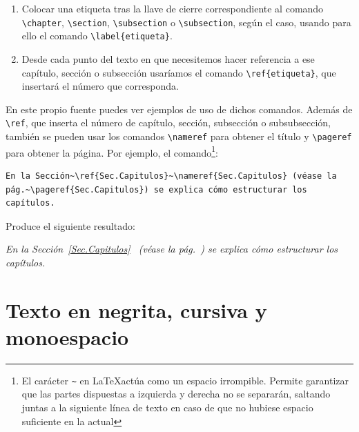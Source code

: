 \begin{enumerate}
    \item Colocar una etiqueta tras la llave de cierre correspondiente al comando \verb|\chapter|, \verb|\section|, \verb|\subsection| o \verb|\subsection|, según el caso, usando para ello el comando \verb|\label{etiqueta}|.
    \item Desde cada punto del texto en que necesitemos hacer referencia a ese capítulo, sección o subsección usaríamos el comando \verb|\ref{etiqueta}|, que insertará el número que corresponda.
\end{enumerate}

En este propio fuente puedes ver ejemplos de uso de dichos comandos. Además de \verb|\ref|, que inserta el número de capítulo, sección, subsección o subsubsección, también se pueden usar los comandos \verb|\nameref| para obtener el título y \verb|\pageref| para obtener la página. Por ejemplo, el comando\footnote{El carácter \texttt{\~} en \LaTeX actúa como un espacio irrompible. Permite garantizar que las partes dispuestas a izquierda y derecha no se separarán, saltando juntas a la siguiente línea de texto en caso de que no hubiese espacio suficiente en la actual}:

\begin{verbatim}
En la Sección~\ref{Sec.Capitulos}~\nameref{Sec.Capitulos} (véase la 
pág.~\pageref{Sec.Capitulos}) se explica cómo estructurar los capítulos.
\end{verbatim}

Produce el siguiente resultado:

\textit{En la Sección~\ref{Sec.Capitulos}~ (véase la pág.~\pageref{Sec.Capitulos}) se explica cómo estructurar los capítulos.}

\section{Texto en negrita, cursiva y monoespacio}


